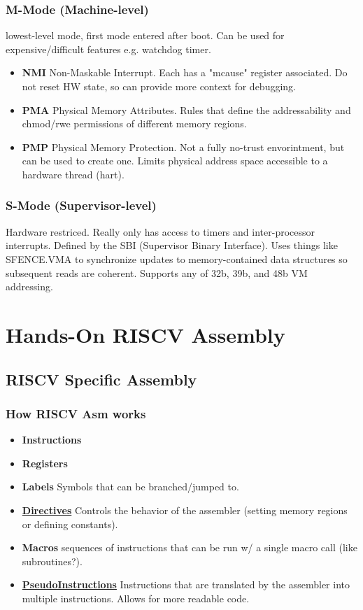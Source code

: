 \documentclass[10pt,a4paper]{article}
\begin{document}
      \subsubsection{M-Mode (Machine-level)}
        lowest-level mode, first mode entered after boot. Can be used for expensive/difficult features e.g. watchdog timer.
        \begin{itemize}
          \item \textbf{NMI} Non-Maskable Interrupt. Each has a "mcause" register associated. Do not reset HW state, so can provide more context for debugging.
          \item \textbf{PMA} Physical Memory Attributes. Rules that define the addressability and chmod/rwe permissions of different memory regions.
          \item \textbf{PMP} Physical Memory Protection. Not a fully no-trust envorintment, but can be used to create one. Limits physical address space accessible to a hardware thread (hart).
        \end{itemize}

      \subsubsection{S-Mode (Supervisor-level)}
        Hardware restriced. Really only has access to timers and inter-processor interrupts. Defined by the SBI (Supervisor Binary Interface). Uses things like SFENCE.VMA to synchronize updates to memory-contained data structures so subsequent reads are coherent. Supports any of 32b, 39b, and 48b VM addressing.
\section{Hands-On RISCV Assembly}
    \subsection{RISCV Specific Assembly}
      \subsubsection{How RISCV Asm works}
        \begin{itemize}
          \item \textbf{Instructions}
          \item \textbf{Registers}
          \item \textbf{Labels} Symbols that can be branched/jumped to.
          \item \textbf{\href{https://github.com/riscv-non-isa/riscv-asm-manual/blob/lpad_hash/riscv-asm.md}{Directives}} Controls the behavior of the assembler (setting memory regions or defining constants).
          \item \textbf{Macros} sequences of instructions that can be run w/ a single macro call (like subroutines?).
          \item \textbf{\href{https://github.com/riscv-non-isa/riscv-asm-manual/blob/main/src/asm-manual.adoc}{PseudoInstructions}} Instructions that are translated by the assembler into multiple instructions. Allows for more readable code.
        \end{itemize}
\end{document}
